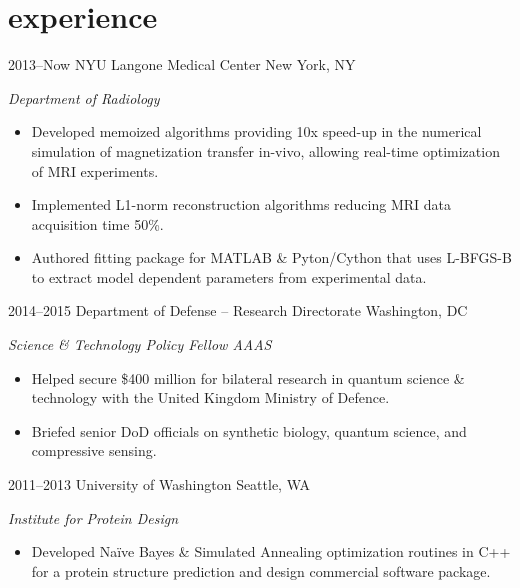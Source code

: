\documentclass[]{friggeri-cv} %
\begin{document}

\section{experience}


\begin{entrylist}


\entry
{2013--Now}
{NYU Langone Medical Center}
{New York, NY}
{\emph{Department of Radiology}
\begin{itemize}
\item Developed memoized algorithms providing 10x speed-up in the numerical simulation of magnetization transfer in-vivo, allowing real-time optimization of MRI experiments.
\item Implemented L1-norm reconstruction algorithms reducing MRI data acquisition time 50\%.  
\item Authored fitting package for MATLAB \& Pyton/Cython that uses L-BFGS-B to extract model dependent parameters from experimental data.    
\end{itemize}}

\entry
{2014--2015}
{Department of Defense -- Research Directorate}
{Washington, DC}
{\emph{Science \& Technology Policy Fellow AAAS}
\begin{itemize}
\item Helped secure \$400 million for bilateral research in quantum science \& technology with the United Kingdom Ministry of Defence. 
\item Briefed senior DoD officials on synthetic biology, quantum science, and compressive sensing.
\end{itemize}}

\entry
{2011--2013}
{University of Washington}
{Seattle, WA}
{\emph{Institute for Protein Design}
\begin{itemize}
\item Developed Na{\"i}ve Bayes \& Simulated Annealing optimization routines in C++ for a protein structure prediction and design commercial software package.\end{itemize}}


\end{entrylist}
\end{document}
